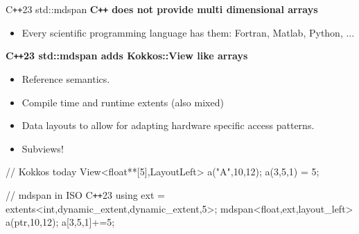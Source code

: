\iffull
\begin{frame}[fragile]{C\texttt{++}23 std::mdspan}
   \textbf{C\texttt{++} does not provide multi dimensional arrays}
	\begin{itemize}
           \item Every scientific programming language has them: Fortran, Matlab, Python, ... 
	\end{itemize}

	\textbf{C\texttt{++}23 std::mdspan adds Kokkos::View like arrays}
	\begin{itemize}
		\item Reference semantics.
		\item Compile time and runtime extents (also mixed)
		\item Data layouts to allow for adapting hardware specific access patterns. 
		\item Subviews!
	\end{itemize}

  \begin{code}[linebackgroundcolor={
      },
      keywords={View,LayoutLeft,extents,mdspan,dynamic_extent,layout_left}, frame=single
    ]
// Kokkos today
View<float**[5],LayoutLeft> a("A",10,12); a(3,5,1) = 5;

// mdspan in ISO C\texttt{++}23
using ext = extents<int,dynamic_extent,dynamic_extent,5>;
mdspan<float,ext,layout_left> a(ptr,10,12); a[3,5,1]+=5;
  \end{code}

\end{frame}
\fi


%


